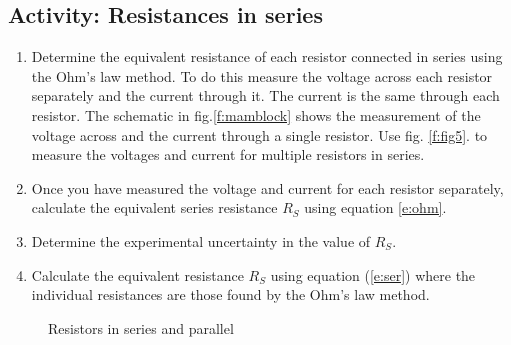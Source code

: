 \subsection{Activity: Resistances in series} \label{s:series}
\begin{enumerate}
	\item \label{l:eqs} Determine the equivalent resistance of each resistor connected in series using the Ohm's law method. To do this measure the voltage across each resistor separately and the current through it. The current is the same through each resistor. The schematic in fig.\ref{f:mamblock} shows the measurement of the voltage across and the current through a single resistor. Use fig. \ref{f:fig5}. to measure the voltages and current for multiple resistors in series.
	
	\item Once you have measured the voltage and current for each resistor separately, calculate the equivalent series resistance $R_S$ using equation \ref{e:ohm}.
	
	\item Determine the experimental uncertainty in the value of $R_S$. %
	
	\item Calculate the equivalent resistance $R_S$ using equation (\ref{e:ser}) where the individual resistances are those found by the Ohm's law method. %
\end{enumerate}


\begin{figure}[htb] \centering
 \hfill
 \caption{Resistors in series and parallel}\label{f:serpar}
\end{figure}


